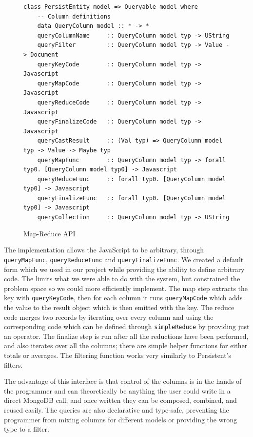 \documentclass[letterpaper,twocolumn,9pt]{article}
\newcommand{\code}[1]{\texttt{#1}}
\begin{document}
\begin{figure}[t]
\footnotesize{
\begin{verbatim}
class PersistEntity model => Queryable model where
    -- Column definitions
    data QueryColumn model :: * -> *
    queryColumnName     :: QueryColumn model typ -> UString
    queryFilter         :: QueryColumn model typ -> Value -> Document
    queryKeyCode        :: QueryColumn model typ -> Javascript
    queryMapCode        :: QueryColumn model typ -> Javascript
    queryReduceCode     :: QueryColumn model typ -> Javascript
    queryFinalizeCode   :: QueryColumn model typ -> Javascript
    queryCastResult     :: (Val typ) => QueryColumn model typ -> Value -> Maybe typ
    queryMapFunc        :: QueryColumn model typ -> forall typ0. [QueryColumn model typ0] -> Javascript
    queryReduceFunc     :: forall typ0. [QueryColumn model typ0] -> Javascript
    queryFinalizeFunc   :: forall typ0. [QueryColumn model typ0] -> Javascript
    queryCollection     :: QueryColumn model typ -> UString
\end{verbatim}
}
    \caption{Map-Reduce API}
    \label{queryable}
\end{figure}

The implementation allows the JavaScript to be arbitrary, through \code{queryMapFunc}, \code{queryReduceFunc} and \code{queryFinalizeFunc}.  We created a default form which we used in our project while providing the ability to define arbitrary code.  The limits what we were able to do with the system, but constrained the problem space so we could more efficiently implement.  The map step extracts the key with \code{queryKeyCode}, then for each column it runs \code{queryMapCode} which adds the value to the result object which is then emitted with the key.  The reduce code merges two records by iterating over every column and using the corresponding code which can be defined through \code{simpleReduce} by providing just an operator.  The finalize step is run after all the reductions have been performed, and also iterates over all the columns; there are simple helper functions for either totals or averages.  The filtering function works very similarly to Persistent's filters.

The advantage of this interface is that control of the columns is in the hands of the programmer and can theoretically be anything the user could write in a direct MongoDB call, and once written they can be composed, combined, and reused easily.  The queries are also declarative and type-safe, preventing the programmer from mixing columns for different models or providing the wrong type to a filter.
\end{document}

